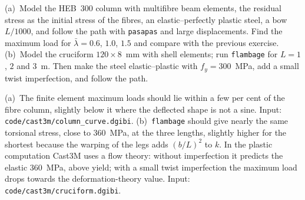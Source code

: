 \label{exo:tw-computer-castem}
%
(a)~Model the HEB~300 column with multifibre beam elements, the residual stress as the initial stress of the
fibres, an elastic--perfectly plastic steel, a bow $L/1000$, and follow the path with \texttt{pasapas} and large
displacements. Find the maximum load for $\bar\lambda = 0.6$, $1.0$, $1.5$ and compare with the previous exercise.
(b)~Model the cruciform $120\times8$~mm with shell elements; run \texttt{flambage} for $L = 1$, $2$ and $3$~m. Then
make the steel elastic--plastic with $f_y = 300$~MPa, add a small twist imperfection, and follow the path.
\begin{solution}
(a)~The finite element maximum loads should lie within a few per cent of the fibre column, slightly below it
where the deflected shape is not a sine. Input: \texttt{code/cast3m/column\_curve.dgibi}. (b)~\texttt{flambage}
should give nearly the same torsional stress, close to $360$~MPa, at the three lengths, slightly higher for
the shortest because the warping of the legs adds $(b/L)^2$ to $k$. In the plastic computation Cast3M uses a flow theory: without imperfection it predicts the elastic
$360$~MPa, above yield; with a small twist imperfection the maximum load drops towards the deformation-theory
value. Input: \texttt{code/cast3m/cruciform.dgibi}.
\end{solution}

